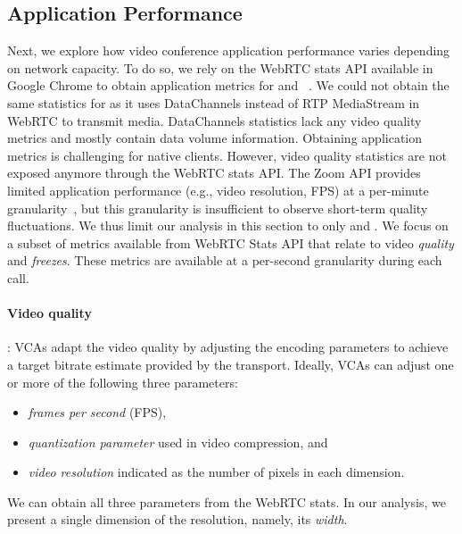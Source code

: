 \subsection{Application Performance}
\label{subsec:application_performance}

Next, we explore how video conference application performance varies depending
on network capacity.  To do so, we rely on the WebRTC stats API
available in Google Chrome to obtain application metrics for \teamsbrowser and
\meet~\cite{webrtc_stats}. We could not obtain the same statistics for
\zoombrowser as it uses DataChannels instead of RTP MediaStream in WebRTC to
transmit media. DataChannels statistics lack any video quality metrics and
mostly contain data volume information. Obtaining application metrics is
challenging for native clients.  However, video quality statistics are not
exposed anymore through the WebRTC stats API. The Zoom API provides limited
application performance (e.g., video resolution, FPS) at a per-minute
granularity~\cite{zoom_qos_api}, but this granularity is insufficient to
observe short-term quality fluctuations.  We thus limit our analysis in this
section to only \meet and \teamsbrowser. We focus on a subset of metrics
available from WebRTC Stats API that relate to video \textit{quality} and
\textit{freezes}. These metrics are available at a per-second granularity
during each call. 

\paragraph{Video quality}: VCAs adapt the video quality by adjusting the
encoding parameters to achieve a target bitrate estimate provided by the
transport. Ideally, VCAs can adjust one or more of the following three
parameters: 
\begin{itemize}
    \itemsep=-1pt
    \item \emph{frames per second} (FPS), 
    \item \textit{quantization parameter} used in video compression, and  
    \item \textit{video resolution} indicated as the number of pixels in each dimension. 
\end{itemize}
\noindent
We can obtain all three
parameters from the WebRTC stats. In our analysis, we present a single
dimension of the resolution, namely, its \textit{width}. 

